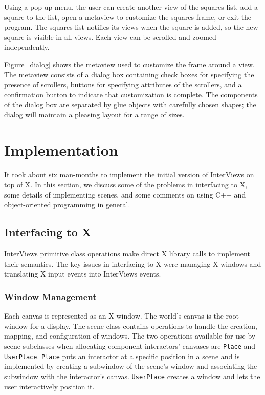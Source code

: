 Using a pop-up menu,
the user can create another view of the squares list,
add a square to the list, open a metaview to customize the squares frame,
or exit the program.
The squares list notifies its views when the square is added,
so the new square is visible in all views.  Each view can be scrolled and 
zoomed independently.

\begin{figure*}
\vspace{3in}
\caption{Squares metaview dialog}
\label{dialog}
\end{figure*}

Figure~\ref{dialog} shows the metaview used to customize
the frame around a view.
The metaview consists of a dialog box
containing check boxes for specifying the presence
of scrollers, buttons for specifying attributes of the scrollers, and
a confirmation button to indicate that customization is complete.
The components of the dialog box are separated by glue objects with
carefully chosen shapes; the dialog will
maintain a pleasing layout for a range of sizes.

\section{Implementation}
It took about six man-months
to implement the initial version of InterViews on top of X.
In this section, we discuss some of the problems in interfacing to X,
some details of implementing scenes, and
some comments on using C++ and object-oriented programming in general.

\subsection{Interfacing to X}
InterViews primitive class operations make direct X library calls
to implement their semantics.
The key issues in interfacing to X were managing X windows and
translating X input events into InterViews events.

\subsubsection{Window Management}
Each canvas is represented as an X window.
The world's canvas is the root window for a display.
The scene class contains operations to handle
the creation, mapping, and configuration of windows.
The two operations available for use by scene subclasses when allocating
component interactors' canvases are
{\tt Place} and {\tt UserPlace}.
{\tt Place} puts an interactor at a specific position
in a scene and is implemented by creating a subwindow
of the scene's window and associating the subwindow with
the interactor's canvas.
{\tt UserPlace} creates a window and
lets the user interactively position it.

